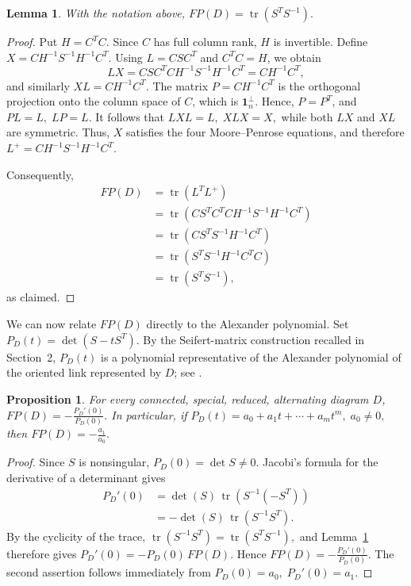 \documentclass[a4paper,12pt]{amsart}
\numberwithin{equation}{section}
\theoremstyle{plain}
\newtheorem{proposition}[theorem]{Proposition}
\newtheorem{lemma}[theorem]{Lemma}
\theoremstyle{definition}
\begin{document}
\begin{lemma}
	\label{lem:pseudoinverse}
	With the notation above,
	$
	FP(D)=\operatorname{tr}(S^T S^{-1}).
	$
\end{lemma}

\begin{proof}
	Put
	$
	H=C^TC.
	$
	Since $C$ has full column rank, $H$ is invertible. Define
	$
	X=
	CH^{-1}S^{-1}H^{-1}C^T.
	$
	Using $L=CSC^T$ and $C^TC=H$, we obtain
	$$
	LX
	=
	CSC^TCH^{-1}S^{-1}H^{-1}C^T
	=
	CH^{-1}C^T,
	$$
	and similarly
	$
	XL=CH^{-1}C^T.
	$
	The matrix
	$
	P=CH^{-1}C^T
	$
	is the orthogonal projection onto the column space of $C$, which is
	$\mathbf{1}_n^\perp$. Hence, $P=P^T$, and
	$
	PL=L,
	\;
	LP=L.
	$
	It follows that
	$
	LXL=L,
	\;
	XLX=X,
	$
	while both $LX$ and $XL$ are symmetric. Thus, $X$ satisfies the four
	Moore--Penrose equations, and therefore
	$
	L^+=CH^{-1}S^{-1}H^{-1}C^T.
	$
	
	Consequently,
	\begin{align*}
		FP(D)
		&=\operatorname{tr}(L^T L^+)\\
		&=\operatorname{tr}
		\left(
		CS^TC^T
		CH^{-1}S^{-1}H^{-1}C^T
		\right)\\
		&=\operatorname{tr}
		\left(
		CS^TS^{-1}H^{-1}C^T
		\right)\\
		&=\operatorname{tr}
		\left(
		S^TS^{-1}H^{-1}C^TC
		\right)\\
		&=\operatorname{tr}(S^TS^{-1}),
	\end{align*}
	as claimed.
\end{proof}


We can now relate $FP(D)$ directly to the Alexander polynomial.
Set
$
P_D(t)=\det(S-tS^T).
$
By the Seifert-matrix construction recalled in Section~2,
$P_D(t)$ is a polynomial representative of the Alexander polynomial
of the oriented link represented by $D$; see \cite{SilWil19}.

\begin{proposition}
	\label{prop:alexanderFP}
	For every connected, special, reduced, alternating diagram $D$,
	$
	FP(D)
	=
	-\frac{P_D'(0)}{P_D(0)}.
	$
	In particular, if
	$
	P_D(t)=a_0+a_1t+\cdots+a_mt^m,
	\; a_0\neq0,
	$
	then
	$
	FP(D)=-\frac{a_1}{a_0}.
	$
\end{proposition}

\begin{proof}
	Since $S$ is nonsingular,
	$
	P_D(0)=\det S\neq0.
	$
	Jacobi's formula for the derivative of a determinant gives
	\begin{align*}
		P_D'(0)
		&=
		\det(S)\,
		\operatorname{tr}
		\left(
		S^{-1}(-S^T)
		\right)\\
		&=
		-\det(S)\,
		\operatorname{tr}(S^{-1}S^T).
	\end{align*}
	By the cyclicity of the trace,
	$
	\operatorname{tr}(S^{-1}S^T)
	=
	\operatorname{tr}(S^TS^{-1}),
	$
	and Lemma~\ref{lem:pseudoinverse} therefore gives
	$
	P_D'(0)
	=
	-P_D(0)\,FP(D).
	$
	Hence
	$
	FP(D)
	=
	-\frac{P_D'(0)}{P_D(0)}.
	$
	The second assertion follows immediately from
	$
	P_D(0)=a_0,
	\;
	P_D'(0)=a_1.
	$
\end{proof}
\end{document}

